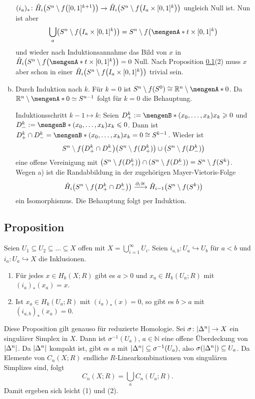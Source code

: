 \begin{enumerate}[a)]
	$(i_a)_* \colon \tilde{H}_i \enbrace*{S^n \setminus f \enbrace*{[0,1]^{k+1}}} \to \tilde{H}_i \enbrace*{S^n \setminus f \enbrace*{I_a \times [0,1]^k} } $ ungleich Null 
	ist. Nun ist aber 
	\[
		\bigcup_a \enbrace*{S^n \setminus f \enbrace*{I_a \times [0,1]^k}} = S^n \setminus f \enbrace*{\set{t} \times [0,1]^k }  
	\]
	und wieder nach Induktionsannahme das Bild von $x$ in $\tilde{H}_i \enbrace*{S^n \setminus f \enbrace*{\set{t} \times [0,1]^k}} =0$ Null. Nach Proposition 
	\ref{sub:1011}(2) muss $x$ aber schon in einer $\tilde{H}_i \enbrace*{S^n \setminus f \enbrace*{I_a \times [0,1]^k} }$ trivial sein. \light
	\item Durch Induktion nach $k$. Für $k=0$ ist $S^n \setminus f(S^0) \cong \mathds{R}^n \setminus \set{0}$. Da $\mathds{R}^n \setminus \set{0} \simeq S^{n-1}$
	folgt für $k=0$ die Behauptung.
	
	Induktionsschritt $k-1 \mapsto k$: Seien $D^k_+ := \set[(x_0,\ldots ,x_k)]{x_k \ge 0}$ und $D^k_- := \set[(x_0, \ldots , x_k)]{x_k \le 0}$. Dann ist 
	$D^k_+ \cap D^k_- = \set[(x_0, \ldots ,x_k)]{x_k=0} \cong S^{k-1}$. Wieder ist 
	\[
		S^n \setminus f \enbrace*{D^k_+ \cap D^k_-} \enbrace*{S^n \setminus f(D^k_+)} \cup \enbrace*{S^n \setminus f(D^k_-)}  
	\]
	eine offene Vereinigung mit $\enbrace*{S^n \setminus f(D^k_+)} \cap (S^n \setminus f(D^k_-)) = S^n \setminus f(S^k)$. Wegen a) ist die Randabbildung in der zugehörigen
	Mayer-Vietoris-Folge
	\[
		\tilde{H}_i \enbrace*{S^n \setminus f \enbrace*{D^k_+ \cap D^k_-} } \xrightarrow{\partial_i \cong} \tilde{H}_{i-1} \enbrace*{S^n \setminus f(S^k)}   
	\]
	ein Isomorphismus. Die Behauptung folgt per Induktion. \bewende
\end{enumerate}

\subsection{Proposition} %
\label{sub:1011}
Seien $U_1 \subseteq U_2 \subseteq \ldots  \subseteq X$ offen mit $X = \bigcup_{i=1}^\infty U_i$. Seien $i_{a,b} \colon U_a \hookrightarrow U_b$ für $a < b$ und 
$i_a \colon U_a \hookrightarrow X$ die Inklusionen.
\begin{enumerate}[(1)]
	\item Für jedes $x \in H_k(X;R)$ gibt es $a >0$ und $x_a \in H_k(U_a;R)$ mit $(i_a)_*(x_a)=x$.
	\item Ist $x_a \in H_k(U_a;R)$ mit $(i_a)_*(x)=0$, so gibt es $b >a$ mit $(i_{a,b})_*(x_a)=0$.
\end{enumerate}
Diese Proposition gilt genauso für reduzierte Homologie.
Sei $\sigma \colon \abs*{\Delta^n} \to X$ ein singulärer Simplex in $X$. Dann ist $\sigma ^{-1}(U_a)$, $a \in \mathds{N}$ eine offene Überdeckung von $\abs*{\Delta^n}$. Da 
$\abs*{\Delta^n}$ kompakt ist, gibt es $a$ mit $\abs*{\Delta^n} \subseteq \sigma ^{-1}(U_a)$, also $\sigma \enbrace*{\abs*{\Delta^n}} \subseteq U_a$. Da Elemente  von
$C_n(X;R)$ endliche $R$-Linearkombinationen von singulären Simplizes sind, folgt 
\[
	C_n(X;R) = \bigcup_a C_n(U_a;R).
\]
Damit ergeben sich leicht (1) und (2). \bewende
\newpage

